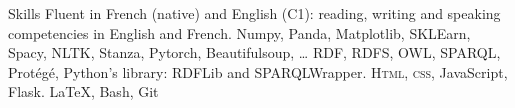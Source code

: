 
\begin{rubric}{Skills}
\entry*[Languages]
	Fluent in French (native) and English (C1): reading, writing and speaking competencies in English and French.
\entry*[Python]
	Numpy, Panda, Matplotlib, SKLEarn, Spacy, NLTK, Stanza, Pytorch, Beautifulsoup, \ldots
{}
	RDF, RDFS, OWL, SPARQL, Protégé, Python's library: RDFLib and SPARQLWrapper.
	\textsc{Html, css}, JavaScript, Flask.
\entry*[Misc.]
	\LaTeX, Bash, Git
\end{rubric}
